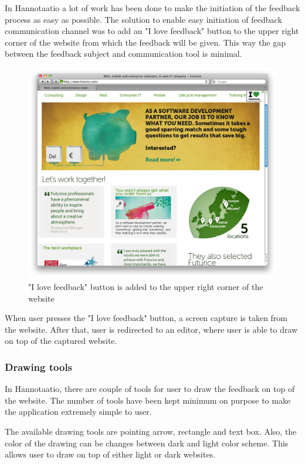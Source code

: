 \documentclass[english,12pt,a4paper,pdftex]{article}
\begin{document}
In Hannotaatio a lot of work has been done to make the initiation of the feedback process as easy as possible. The solution to enable easy initiation of feedback communication channel was to add an "I love feedback" button to the upper right corner of the website from which the feedback will be given. This way the gap between the feedback subject and communication tool is minimal.

\begin{figure}[htb]
\begin{center}
\includegraphics[width=1.0\textwidth]{initiate_feedback.png}
\end{center}
\caption{"I love feedback" button is added to the upper right corner of the website}
\end{figure}

When user presses the "I love feedback" button, a screen capture is taken from the website. After that, user is redirected to an editor, where user is able to draw on top of the captured website.

\subsubsection{Drawing tools}

In Hannotaatio, there are couple of tools for user to draw the feedback on top of the website. The number of tools have been kept minimum on purpose to make the application extremely simple to user.

The available drawing tools are pointing arrow, rectangle and text box. Also, the color of the drawing can be changes between dark and light color scheme. This allows user to draw on top of either light or dark websites.
\end{document}
